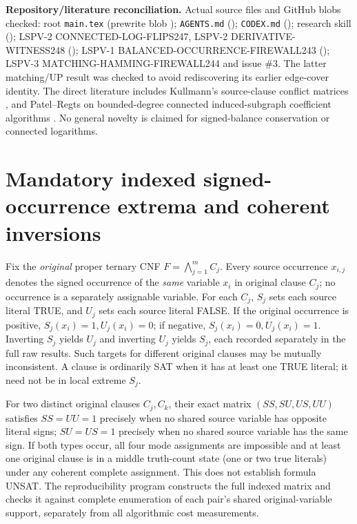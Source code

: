 \documentclass[11pt]{article}
\begin{document}
\noindent\textbf{Repository/literature reconciliation.} Actual source files and GitHub blobs checked: root \texttt{main.tex} (prewrite blob ); \texttt{AGENTS.md} (); \texttt{CODEX.md} (); research skill (); LSPV-2 CONNECTED-LOG-FLIPS247, LSPV-2 DERIVATIVE-WITNESS248 (); LSPV-1 BALANCED-OCCURRENCE-FIREWALL243 (); LSPV-3 MATCHING-HAMMING-FIREWALL244 and issue \#3. The latter matching/UP result was checked to avoid rediscovering its earlier edge-cover identity. The direct literature includes Kullmann's source-clause conflict matrices \cite{Kullmann2003}, and Patel--Regts on bounded-degree connected induced-subgraph coefficient algorithms \cite{PatelRegts2019,PatelRegts2017}. No general novelty is claimed for signed-balance conservation or connected logarithms.

\section{Mandatory indexed signed-occurrence extrema and coherent inversions}
Fix the \emph{original} proper ternary CNF $F=\bigwedge_{j=1}^m C_j$. Every source occurrence $x_{i,j}$ denotes the signed occurrence of the \emph{same} variable $x_i$ in original clause $C_j$; no occurrence is a separately assignable variable. For each $C_j$, $S_j$ sets each source literal TRUE, and $U_j$ sets each source literal FALSE. If the original occurrence is positive, $S_j(x_i)=1,U_j(x_i)=0$; if negative, $S_j(x_i)=0,U_j(x_i)=1$. Inverting $S_j$ yields $U_j$ and inverting $U_j$ yields $S_j$, each recorded separately in the full raw results. Such targets for different original clauses may be mutually inconsistent. A clause is ordinarily SAT when it has at least one TRUE literal; it need not be in local extreme $S_j$.

For two distinct original clauses $C_j,C_k$, their exact matrix $(SS,SU,US,UU)$ satisfies $SS=UU=1$ precisely when no shared source variable has opposite literal signs; $SU=US=1$ precisely when no shared source variable has the same sign. If both types occur, all four mode assignments are impossible and at least one original clause is in a middle truth-count state (one or two true literals) under any coherent complete assignment. This does not establish formula UNSAT. The reproducibility program constructs the full indexed matrix and checks it against complete enumeration of each pair's shared original-variable support, separately from all algorithmic cost measurements.
\end{document}
